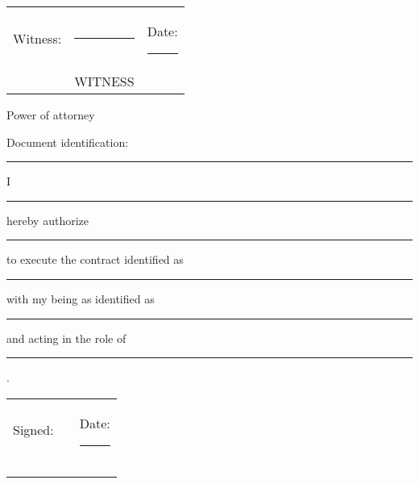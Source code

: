 \documentclass[10pt]{article}
\begin{document}
\vspace{1cm}

\noindent \begin{tabular}{l l l}
Witness:          & \rule{6cm}{.2pt} & Date: \rule{2.4cm}{.2pt}\\
                         & WITNESS      & \\

\end{tabular}

\pagebreak

\begin{center}
{Power of attorney}
\end{center}

Document identification: \rule{10cm}{.2pt}

\vspace{1cm}

I \rule{5cm}{.2pt} hereby authorize \rule{5cm}{.2pt} to execute the
contract identified as \rule{5cm}{.2pt} with my being as identified as
\rule{5cm}{.2pt} and acting in the role of \rule{5cm}{.2pt}. 

\vspace{1cm}

\noindent \begin{tabular}{l l l}
Signed: & \rule{6cm}{.2pt} & Date: \rule{2.4cm}{.2pt}\\
                         &       & \\\\\\
\end{tabular}
\end{document}
